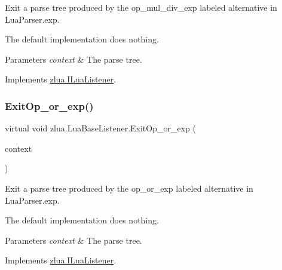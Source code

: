 Exit a parse tree produced by the {\ttfamily op\+\_\+mul\+\_\+div\+\_\+exp} labeled alternative in Lua\+Parser.\+exp. 

The default implementation does nothing.


\begin{DoxyParams}{Parameters}
{\em context} & The parse tree.\\
\hline
\end{DoxyParams}


Implements \mbox{\hyperlink{interfacezlua_1_1_i_lua_listener_a25a0b962824e954f08d1dc84e4e4d13d}{zlua.\+I\+Lua\+Listener}}.

\mbox{\label{classzlua_1_1_lua_base_listener_a2f3d1101cea30188e37757f54eeb45ad}} 
\subsubsection{\texorpdfstring{Exit\+Op\+\_\+or\+\_\+exp()}{ExitOp\_or\_exp()}}
{\footnotesize\ttfamily virtual void zlua.\+Lua\+Base\+Listener.\+Exit\+Op\+\_\+or\+\_\+exp (\begin{DoxyParamCaption}\item[{\mbox{[}\+Not\+Null\mbox{]} \mbox{\hyperlink{classzlua_1_1_lua_parser_1_1_op__or__exp_context}{Lua\+Parser.\+Op\+\_\+or\+\_\+exp\+Context}}}]{context }\end{DoxyParamCaption})\hspace{0.3cm}{\ttfamily [virtual]}}



Exit a parse tree produced by the {\ttfamily op\+\_\+or\+\_\+exp} labeled alternative in Lua\+Parser.\+exp. 

The default implementation does nothing.


\begin{DoxyParams}{Parameters}
{\em context} & The parse tree.\\
\hline
\end{DoxyParams}


Implements \mbox{\hyperlink{interfacezlua_1_1_i_lua_listener_acd1c99a866862f8c938fd314f3859852}{zlua.\+I\+Lua\+Listener}}.

\mbox{\label{classzlua_1_1_lua_base_listener_abf62739a5cda90c32f65e7a81c3e72a2}} 
